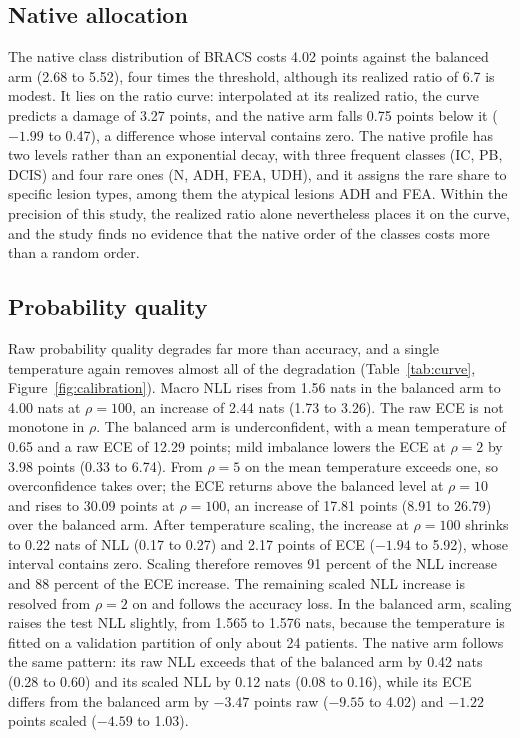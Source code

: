 \subsection{Native allocation}
\label{sec:native-results}
The native class distribution of BRACS costs 4.02 points against the balanced arm (2.68 to 5.52), four times the threshold, although its realized ratio of 6.7 is modest. It lies on the ratio curve: interpolated at its realized ratio, the curve predicts a damage of 3.27 points, and the native arm falls 0.75 points below it ($-1.99$ to 0.47), a difference whose interval contains zero. The native profile has two levels rather than an exponential decay, with three frequent classes (IC, PB, DCIS) and four rare ones (N, ADH, FEA, UDH), and it assigns the rare share to specific lesion types, among them the atypical lesions ADH and FEA. Within the precision of this study, the realized ratio alone nevertheless places it on the curve, and the study finds no evidence that the native order of the classes costs more than a random order.

\subsection{Probability quality}
\label{sec:calibration-results}
Raw probability quality degrades far more than accuracy, and a single temperature again removes almost all of the degradation (Table~\ref{tab:curve}, Figure~\ref{fig:calibration}). Macro NLL rises from 1.56 nats in the balanced arm to 4.00 nats at $\rho=100$, an increase of 2.44 nats (1.73 to 3.26). The raw ECE is not monotone in $\rho$. The balanced arm is underconfident, with a mean temperature of 0.65 and a raw ECE of 12.29 points; mild imbalance lowers the ECE at $\rho=2$ by 3.98 points (0.33 to 6.74). From $\rho=5$ on the mean temperature exceeds one, so overconfidence takes over; the ECE returns above the balanced level at $\rho=10$ and rises to 30.09 points at $\rho=100$, an increase of 17.81 points (8.91 to 26.79) over the balanced arm. After temperature scaling, the increase at $\rho=100$ shrinks to 0.22 nats of NLL (0.17 to 0.27) and 2.17 points of ECE ($-1.94$ to 5.92), whose interval contains zero. Scaling therefore removes 91 percent of the NLL increase and 88 percent of the ECE increase. The remaining scaled NLL increase is resolved from $\rho=2$ on and follows the accuracy loss. In the balanced arm, scaling raises the test NLL slightly, from 1.565 to 1.576 nats, because the temperature is fitted on a validation partition of only about 24 patients. The native arm follows the same pattern: its raw NLL exceeds that of the balanced arm by 0.42 nats (0.28 to 0.60) and its scaled NLL by 0.12 nats (0.08 to 0.16), while its ECE differs from the balanced arm by $-3.47$ points raw ($-9.55$ to 4.02) and $-1.22$ points scaled ($-4.59$ to 1.03).

